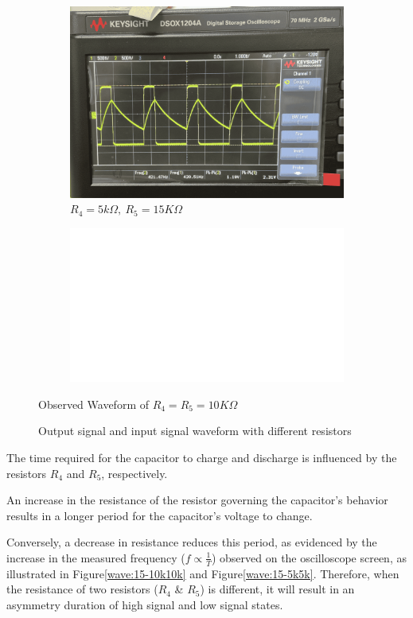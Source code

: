 \begin{figure}[H]
    \begin{subfigure}{0.45\linewidth}
        \includegraphics[width=0.95\linewidth]{Experiment_15/Images/5k15k.png}
        \caption{$R_4=5k\Omega,~R_5=15K\Omega$}
        \label{wave:15-5k15k}
    \end{subfigure}
    \begin{subfigure}{0.45\linewidth}
        \includegraphics[width=0.95\linewidth]{Header/Empty.png}
    \end{subfigure}
    \vfill

    \caption{Observed Waveform of $R_4=R_5=10K\Omega$}
    \caption{Output signal and input signal waveform with different resistors}
\end{figure}


\FloatBarrier
The time required for the capacitor to charge and discharge is influenced by the resistors $R_4$ and $R_5$, respectively.\par
An increase in the resistance of the resistor governing the capacitor's behavior results in a longer period for the capacitor's voltage to change.\par
Conversely, a decrease in resistance reduces this period, as evidenced by the increase in the measured frequency ($f \propto \frac{1}{T}$) observed on the oscilloscope screen, as illustrated in Figure\ref{wave:15-10k10k} and Figure\ref{wave:15-5k5k}.
Therefore, when the resistance of two resistors ($R_4$ \& $R_5$) is different, it will result in an asymmetry duration of high signal and low signal states.

